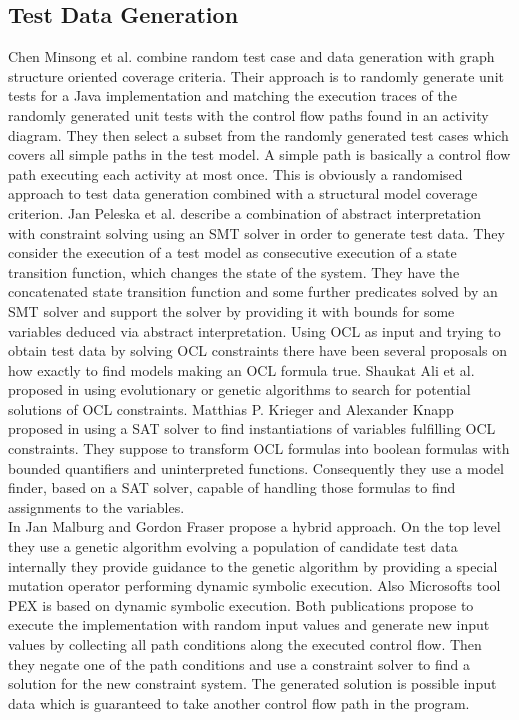 \subsection{Test Data Generation}
Chen Minsong et al. \cite{mingsong2006automatic} combine random test case and data generation with graph structure oriented coverage criteria. Their approach is to randomly generate unit tests for a Java implementation and matching the execution traces of the randomly generated unit tests with the control flow paths found in an activity diagram. They then select a subset from the randomly generated test cases which covers all simple paths in the test model. A simple path is basically a control flow path executing each activity at most once. This is obviously a randomised approach to test data generation combined with a structural model coverage criterion.
Jan Peleska et al. \cite{peleska2011automated} describe a combination of abstract interpretation with constraint solving using an SMT solver in order to generate test data. They consider the execution of a test model as consecutive execution of a state transition function, which changes the state of the system. They have the concatenated state transition function and some further predicates solved by an SMT solver and support the solver by providing it with bounds for some variables deduced via abstract interpretation. 
Using OCL as input and trying to obtain test data by solving OCL constraints there have been several proposals on how exactly to find models making an OCL formula true. Shaukat Ali et al. proposed in \cite{ali2011search} using evolutionary or genetic algorithms to search for potential solutions of OCL constraints. Matthias P. Krieger and Alexander Knapp proposed in \cite{krieger2008executingUnderspecifiedOCL} using a SAT solver to find instantiations of variables fulfilling OCL constraints. They suppose to transform OCL formulas into boolean formulas with bounded quantifiers and uninterpreted functions. Consequently they use a model finder, based on a SAT solver, capable of handling those formulas to find assignments to the variables.\\
In \cite{malburg2011combining} Jan Malburg and Gordon Fraser propose a hybrid approach. On the top level they use a genetic algorithm evolving a population of candidate test data internally they provide guidance to the genetic algorithm by providing a special mutation operator performing dynamic symbolic execution. Also Microsofts tool PEX \cite{pex} is based on dynamic symbolic execution. Both publications propose to execute the implementation with random input values and generate new input values by collecting all path conditions along the executed control flow. Then they negate one of the path conditions and use a constraint solver to find a solution for the new constraint system. The generated solution is possible input data which is guaranteed to take another control flow path in the program.\\
